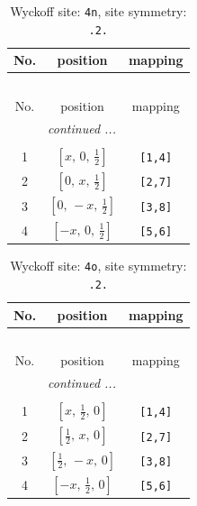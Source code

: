 \documentclass[fleqn,8pt]{jsarticle}
\begin{document}
\renewcommand{\arraystretch}{1.2}
\begin{longtable}{ccc}
\caption{Wyckoff site: {\tt 4n}, site symmetry: {\tt .2.}}
 \\
 \hline \hline
No. & position & mapping \\ \hline \endfirsthead

\multicolumn{2}{l}{\tablename\ \thetable{}} \\
 \hline \hline
No. & position & mapping \\ \hline \endhead

 \hline \hline
\multicolumn{2}{r}{\footnotesize\it continued ...} \\ \endfoot

 \hline \hline
\multicolumn{2}{r}{} \\ \endlastfoot

1 & $\left[ x,\, 0,\, \frac{1}{2} \right]$ & {\tt [1,4]} \\ \hline
2 & $\left[ 0,\, x,\, \frac{1}{2} \right]$ & {\tt [2,7]} \\ \hline
3 & $\left[ 0,\, - x,\, \frac{1}{2} \right]$ & {\tt [3,8]} \\ \hline
4 & $\left[ - x,\, 0,\, \frac{1}{2} \right]$ & {\tt [5,6]} \\
\end{longtable}
\renewcommand{\arraystretch}{1.2}
\begin{longtable}{ccc}
\caption{Wyckoff site: {\tt 4o}, site symmetry: {\tt .2.}}
 \\
 \hline \hline
No. & position & mapping \\ \hline \endfirsthead

\multicolumn{2}{l}{\tablename\ \thetable{}} \\
 \hline \hline
No. & position & mapping \\ \hline \endhead

 \hline \hline
\multicolumn{2}{r}{\footnotesize\it continued ...} \\ \endfoot

 \hline \hline
\multicolumn{2}{r}{} \\ \endlastfoot

1 & $\left[ x,\, \frac{1}{2},\, 0 \right]$ & {\tt [1,4]} \\ \hline
2 & $\left[ \frac{1}{2},\, x,\, 0 \right]$ & {\tt [2,7]} \\ \hline
3 & $\left[ \frac{1}{2},\, - x,\, 0 \right]$ & {\tt [3,8]} \\ \hline
4 & $\left[ - x,\, \frac{1}{2},\, 0 \right]$ & {\tt [5,6]} \\
\end{longtable}
\end{document}
